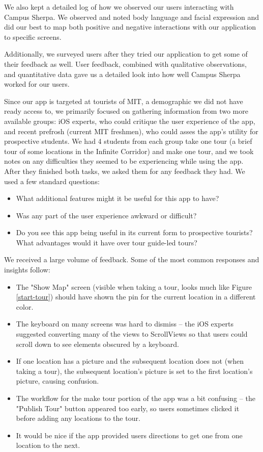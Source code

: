 \documentclass{sigchi}
\begin{document}
We also kept a detailed log of how we observed our users interacting with Campus Sherpa. We observed and noted body language and facial expression and did our best to map both positive and negative interactions with our application to specific screens.

Additionally, we surveyed users after they tried our application to get some of their feedback as well. User feedback, combined with qualitative observations, and quantitative data gave us a detailed look into how well Campus Sherpa worked for our users.


Since our app is targeted at tourists of MIT, a demographic we did not have ready access to, we primarily focused on gathering information from two more available groups: iOS experts, who could critique the user experience of the app, and recent prefrosh (current MIT freshmen), who could asses the app's utility for prospective students. We had 4 students from each group take one tour (a brief tour of some locations in the Infinite Corridor) and make one tour, and we took notes on any difficulties they seemed to be experiencing while using the app. After they finished both tasks, we asked them for any feedback they had. We used a few standard questions:
\begin{itemize}
\item What additional features might it be useful for this app to have?
\item Was any part of the user experience awkward or difficult?
\item Do you see this app being useful in its current form to prospective tourists? What advantages would it have over tour guide-led tours?
\end{itemize}
We received a large volume of feedback. Some of the most common responses and insights follow:
\begin{itemize}
\item The "Show Map" screen (visible when taking a tour, looks much like Figure \ref{start-tour}) should have shown the pin for the current location in a different color.
\item The keyboard on many screens was hard to dismiss -- the iOS experts suggested converting many of the views to ScrollViews so that users could scroll down to see elements obscured by a keyboard.
\item If one location has a picture and the subsequent location does not (when taking a tour), the subsequent location's picture is set to the first location's picture, causing confusion.
\item The workflow for the make tour portion of the app was a bit confusing -- the "Publish Tour" button appeared too early, so users sometimes clicked it before adding any locations to the tour.
\item It would be nice if the app provided users directions to get one from one location to the next.
\end{itemize}
\end{document}
